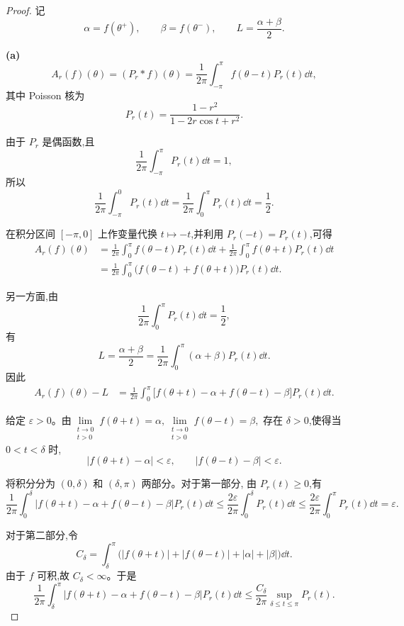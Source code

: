 \begin{proof}
	记
	\[
	\alpha=f(\theta^+),\qquad
	\beta=f(\theta^-),\qquad
	L=\frac{\alpha+\beta}{2}.
	\]
	
	\textbf{(a)}
	\[
	A_r(f)(\theta)
	=(P_r*f)(\theta)
	=\frac{1}{2\pi}\int_{-\pi}^{\pi}
	f(\theta-t)P_r(t)\dd t,
	\]
	其中 Poisson 核为
	\[
	P_r(t)=\frac{1-r^2}{1-2r\cos t+r^2}.
	\]
	
	由于 $P_r$ 是偶函数,且
	\[
	\frac{1}{2\pi}\int_{-\pi}^{\pi}P_r(t)\dd t=1,
	\]
	所以
	\[
	\frac{1}{2\pi}\int_{-\pi}^{0}P_r(t)\dd t
	=
	\frac{1}{2\pi}\int_{0}^{\pi}P_r(t)\dd t
	=\frac12.
	\]
	
	在积分区间 $[-\pi,0]$ 上作变量代换 $t\mapsto-t$,并利用
	$P_r(-t)=P_r(t)$,可得
	\[
	\begin{aligned}
		A_r(f)(\theta)
		&=\frac{1}{2\pi}\int_0^\pi
		f(\theta-t)P_r(t)\dd t
		+\frac{1}{2\pi}\int_0^\pi
		f(\theta+t)P_r(t)\dd t\\
		&=\frac{1}{2\pi}\int_0^\pi
		\bigl(f(\theta-t)+f(\theta+t)\bigr)P_r(t)\dd t.
	\end{aligned}
	\]
	
	另一方面,由
	\[
	\frac{1}{2\pi}\int_0^\pi P_r(t)\dd t=\frac12,
	\]
	有
	\[
	L
	=\frac{\alpha+\beta}{2}
	=\frac{1}{2\pi}\int_0^\pi
	(\alpha+\beta)P_r(t)\dd t.
	\]
	因此
	\[
	\begin{aligned}
		A_r(f)(\theta)-L
		&=\frac{1}{2\pi}\int_0^\pi
		\bigl[
		f(\theta+t)-\alpha
		+f(\theta-t)-\beta
		\bigr]P_r(t)\dd t.
	\end{aligned}
	\]
	
	给定 $\varepsilon>0$。由$\lim\limits_{\substack{t\to0\\t>0}}f(\theta+t)=\alpha,
	\lim\limits_{\substack{t\to0\\t>0}}f(\theta-t)=\beta,$
	存在 $\delta>0$,使得当 $0<t<\delta$ 时,
	\[
	|f(\theta+t)-\alpha|<\varepsilon,
	\qquad
	|f(\theta-t)-\beta|<\varepsilon.
	\]
	
	将积分分为 $(0,\delta)$ 和 $(\delta,\pi)$ 两部分。对于第一部分,
	由 $P_r(t)\geq0$,有
	\[\frac{1}{2\pi}\int_0^\delta
		\left|
		f(\theta+t)-\alpha
		+f(\theta-t)-\beta
		\right|P_r(t)\dd t\leq
		\frac{2\varepsilon}{2\pi}
		\int_0^\delta P_r(t)\dd t\leq
		\frac{2\varepsilon}{2\pi}
		\int_0^\pi P_r(t)\dd t
		=\varepsilon.
	\]
	
	对于第二部分,令
	\[
	C_\delta
	=
	\int_\delta^\pi
	\bigl(
	|f(\theta+t)|+|f(\theta-t)|+|\alpha|+|\beta|
	\bigr)\dd t.
	\]
	由于 $f$ 可积,故 $C_\delta<\infty$。于是
	\[\frac{1}{2\pi}\int_\delta^\pi
		\left|
		f(\theta+t)-\alpha
		+f(\theta-t)-\beta
		\right|P_r(t)\dd t\leq
		\frac{C_\delta}{2\pi}
		\sup_{\delta\leq t\leq\pi}P_r(t).\]
	

\end{proof}
